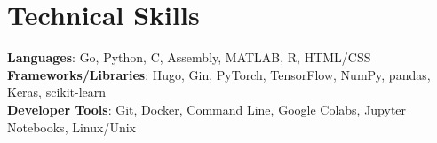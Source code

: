 \documentclass[letterpaper,11pt]{article}
\begin{document}
\section{Technical Skills}
 \begin{itemize}[leftmargin=0.15in, label={}]
    \small{\item{
     \textbf{Languages}{: Go, Python, C, Assembly, MATLAB, R, HTML/CSS} \\
     \textbf{Frameworks/Libraries}{: Hugo, Gin, PyTorch, TensorFlow, NumPy, pandas, Keras, scikit-learn} \\
     \textbf{Developer Tools}{: Git, Docker, Command Line, Google Colabs, Jupyter Notebooks, Linux/Unix}}}
 \end{itemize}
\end{document}
